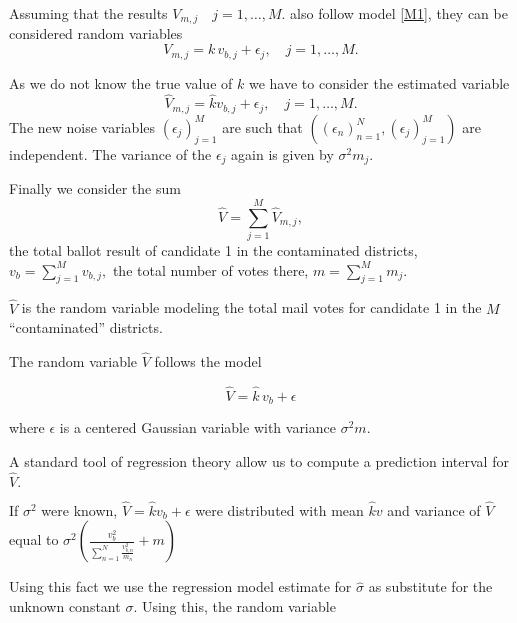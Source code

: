 \documentclass[12pt,a4paper]{article}
\theoremstyle{definition}
\begin{document}
Assuming that the results $V_{m,j} \quad j=1, \dots, M.$ also follow model \ref{M1}, they can be considered
random variables
$$V_{m,j} = k \, v_{b,j}+\epsilon_j, \quad j=1, \dots, M.$$

As we do not know the true value of $k$ we have to consider the estimated variable 
$$\hat{V}_{m,j}=\hat{k}v_{b,j} + \epsilon_j, \quad j=1, \dots, M. $$
The new noise variables $(\epsilon_j)^M_{j=1}$ are such that $((\epsilon_n)^N_{n=1}, (\epsilon_j)^M_{j=1})$ are independent. The variance of the $\epsilon_j$ again is given by $\sigma^2 m_j.$





Finally we consider the sum
$$\hat{V}=\sum^M_{j=1} \hat{V}_{m,j},$$
the total ballot result of candidate 1 in the contaminated districts, $v_b=\sum_{j=1}^{M}v_{b,j},$
the total number of votes there,  $m=\sum_{j=1}^{M}m_j$.

$\hat{V}$ is the random variable modeling the total mail votes for candidate 1 in the $M$ ``contaminated'' districts. 

The random variable $\hat{V}$ follows the model

$$\hat{V}=\hat{k} \, v_b + \epsilon$$

where $\epsilon$ is a centered Gaussian variable with variance $\sigma^2 m$.

A standard tool of regression theory allow us to compute a prediction interval for $\hat{V}.$


If $\sigma^2$ were known, $\hat{V}=\hat{k}v_b + \epsilon$ were distributed with mean $\hat{k} v$ and
variance of $\hat{V}$ equal to $\sigma^2\left(\frac{v_b^2}{\sum_{n=1}^N{\frac{v_{b,n}^2}{m_n}}}+m\right)$

Using this fact we use the regression model estimate for $\hat{\sigma}$ as substitute for
the unknown constant $\sigma$. Using this, the random variable

\end{document}
